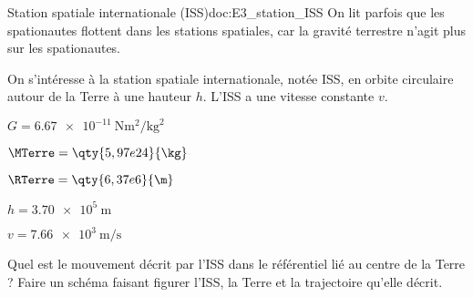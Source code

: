 
\vspace*{-10pt}
\begin{doc}{Station spatiale internationale (ISS)}{doc:E3_station_ISS}
  On lit parfois que les spationautes flottent dans les stations spatiales, car la gravité terrestre n'agit plus sur les spationautes.
  
  \begin{wrapfigure}{r}{0.4\linewidth}
    \vspace*{-30pt}
    \centering
  \end{wrapfigure}
  
  On s'intéresse à la station spatiale internationale, notée ISS, en orbite circulaire autour de la Terre à une hauteur $h$.
  L'ISS a une vitesse constante $v$.

  \begin{listePoints}
    \item $G = \qty{6,67e-11}{\newton\m\squared \per\kg\squared}$
    \item $\MTerre = \qty{5,97e24}{\kg}$
    \item $\RTerre = \qty{6,37e6}{\m}$
    \item $h = \qty{3,70e5}{\m}$
    \item $v = \qty{7,66e3}{\m\per\s}$
  \end{listePoints}
\end{doc}

\numeroQuestion
  \label{exo:schema_ISS}
  Quel est le mouvement décrit par l'ISS dans le référentiel lié au centre de la Terre ?
  Faire un schéma faisant figurer l'ISS, la Terre et la trajectoire qu'elle décrit.



\pasCorrection{\newpage}

